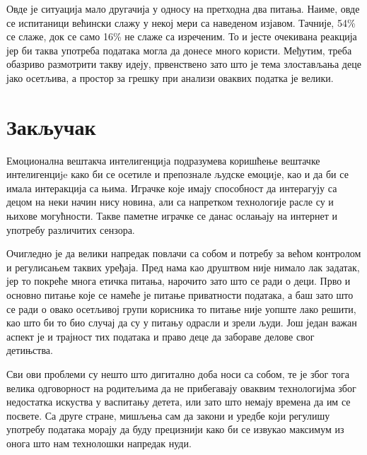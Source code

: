 \documentclass{article}
\begin{document}
Овде је ситуација мало другачија у односу на претходна два питања. Наиме, овде се испитаници већински слажу у некој мери са наведеном изјавом. Тачније, 54\% се слаже, док се само 16\% не слаже са изреченим. То и јесте очекивана реакција јер би таква употреба података могла да донесе много користи. Међутим, треба обазриво размотрити такву идеју, првенствено зато што је тема злостављања деце јако осетљива, а простор за грешку при анализи оваквих податка је велики.

\newpage
\section{Закључак}
Емоционална вештакча интелигенциjа подразумева коришћење вештачке 
интелигенциje како би се осетиле и препознале људске емоциjе, као и да би се имала интеракција са њима. Играчке које имају способност да интерагују са децом на неки начин нису новина, али са напретком технологије расле су и њихове могућности. Такве паметне играчке се данас ослањају на интернет и употребу различитих сензора. 

Очигледно је да велики напредак повлачи са собом и потребу за већом контролом и регулисањем таквих уређаја. Пред нама као друштвом није нимало лак задатак, јер то покреће многа етичка питања, нарочито зато што се ради о деци. Прво и основно питање које се намеће је питање приватности података, а баш зато што се ради о овако осетљивој групи корисника то питање није уопште лако решити, као што би то био случај да су у питању одрасли и зрели људи. Још један важан аспект је и трајност тих података и право деце да забораве делове свог детињства. 

Сви ови проблеми су нешто што дигитално доба носи са собом, те је због тога велика одговорност на родитељима да не прибегавају оваквим технологијма због недостатка искуства у васпитању детета, или зато што немају времена да им се посвете. Са друге стране, мишљења сам да закони и уредбе који регулишу употребу података морају да буду прецизнији како би се извукао максимум из онога што нам технолошки напредак нуди.

\newpage
\printbibliography[title={Литература}]
\end{document}
